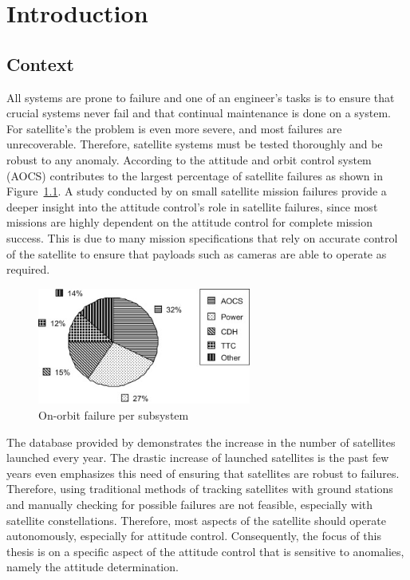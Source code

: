 %
%


\chapter{Introduction}
\label{chap:Introduction}
\section{Context}
All systems are prone to failure and one of an engineer's tasks is to ensure that crucial systems never fail and that continual maintenance is done on a system. For satellite's the problem is even more severe, and most failures are unrecoverable. Therefore, satellite systems must be tested thoroughly and be robust to any anomaly. According to \cite{tafazoli2009study} the attitude and orbit control system (AOCS) contributes to the largest percentage of satellite failures as shown in Figure~\ref{fig:OnOrbitFailureSubsystem}. A study conducted by \cite{Jacklin2019} on small satellite mission failures provide a deeper insight into the attitude control's role in satellite failures, since most missions are highly dependent on the attitude control for complete mission success. This is due to many mission specifications that rely on accurate control of the satellite to ensure that payloads such as cameras are able to operate as required.

\begin{figure}[!htb]
	\centering
	\includegraphics[width = 7cm]{Figures/OnOrbitFailureDistribution.jpg}
	\caption{On-orbit failure per subsystem \cite{tafazoli2009study}}
	\label{fig:OnOrbitFailureSubsystem}
\end{figure}
The database provided by \cite{swartwout2015CubeSat} demonstrates the increase in the number of satellites launched every year. The drastic increase of launched satellites is the past few years even emphasizes this need of ensuring that satellites are robust to failures. Therefore, using traditional methods of tracking satellites with ground stations and manually checking for possible failures are not feasible, especially with satellite constellations. Therefore, most aspects of the satellite should operate autonomously, especially for attitude control. Consequently, the focus of this thesis is on a specific aspect of the attitude control that is sensitive to anomalies, namely the attitude determination. 

